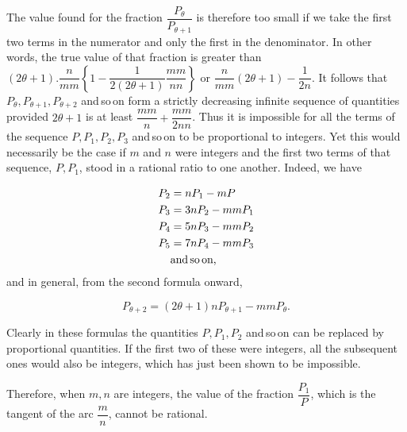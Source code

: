 
The value found for the fraction $\dfrac{P_\theta}{P_{\theta+1}}$ is therefore too small
if we take the first two terms in the numerator and only the first in the
denominator. In other words, the true value of that fraction is greater than
$(2\theta+1) . \dfrac{n}{mm}\left\{1-\dfrac{1}{2(2\theta+1)}\dfrac{mm}{nn}\right\}$ or
$\dfrac{n}{mm}(2\theta+1)-\dfrac{1}{2n}$. 
It follows that $P_\theta, P_{\theta+1}, P_{\theta+2}$ and\,so\,on form a strictly
decreasing infinite sequence of quantities provided $2\theta+1$ is at least
$\dfrac{mm}{n}+\dfrac{mm}{2nn}$. Thus it is impossible for all the terms of the sequence
$P, P_1, P_2, P_3$ and\,so\,on to be proportional to integers. Yet this would
necessarily be the case if $m$ and $n$ were integers and
the first two terms of that sequence, $P, P_1$, stood in a rational
ratio to one another. Indeed, we have

\[
\begin{aligned}
P_2 &= nP_1 - mP\\
P_3 &= 3nP_2 - mmP_1\\
P_4 &= 5nP_3 - mmP_2\\
P_5 &= 7nP_4 - mmP_3\\
&\text{and\,so\,on,}
\end{aligned}
\]
\noindent and in general, from the second formula onward,

\[
P_{\theta+2} = (2\theta+1)nP_{\theta+1} - mmP_\theta.
\]

Clearly in these formulas the quantities $P, P_1, P_2$ and\,so\,on can be
replaced by proportional quantities. If the first two of these were integers,
all the subsequent ones would also be integers, which has just been shown to be impossible.

Therefore, when $m, n$ are integers, the value of the fraction
$\dfrac{P_1}{P}$, which is the tangent of the arc
$\dfrac{m}{n}$, cannot be rational.
